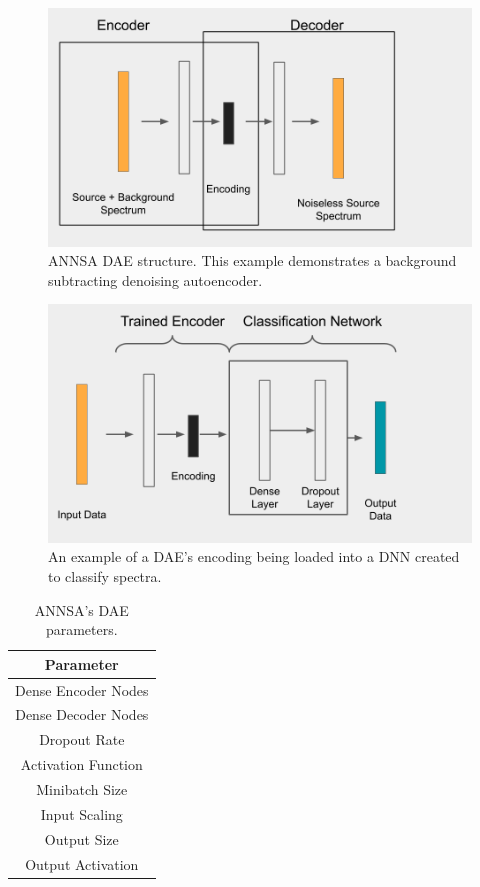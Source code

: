 \begin{figure}[H]
\centering
\includegraphics[trim=0 0 125 0,clip,width=0.8\linewidth]{images/annsa_dae.png}
\caption{ANNSA DAE structure. This example demonstrates a background subtracting denoising autoencoder.}
\label{fig:annsa_dae}
\end{figure}

\begin{figure}[H]
\centering
\includegraphics[trim=0 40 85 0,clip,width=0.8\linewidth]{images/annsa_daednn.png}
\caption{An example of a DAE's encoding being loaded into a DNN created to classify spectra.}
\label{fig:annsa_daednn}
\end{figure}


\begin{table}[H]
\centering
\caption{ANNSA's DAE parameters.}
\begin{tabular}{c}
\hline
Parameter \\ \hline
Dense Encoder Nodes \\
Dense Decoder Nodes \\
Dropout Rate \\
Activation Function \\
Minibatch Size \\ 
Input Scaling \\
Output Size \\
Output Activation \\ \hline
\end{tabular}
\label{table:annsa_dae_params}
\end{table}



